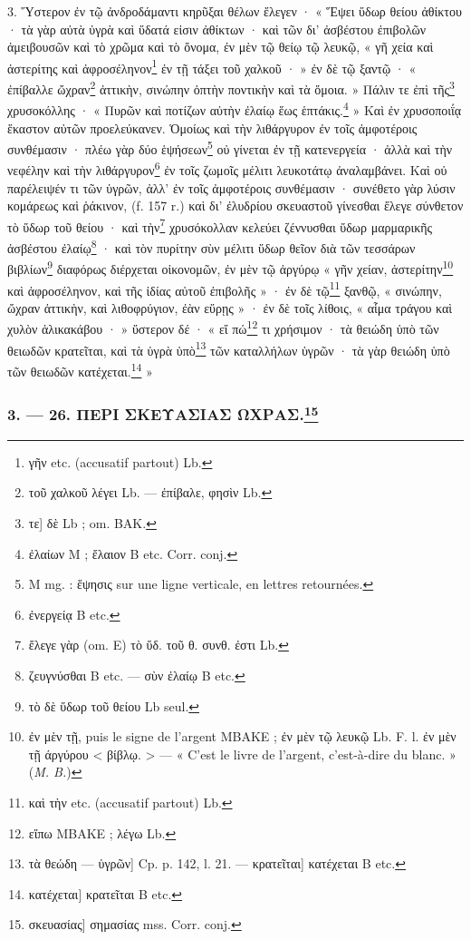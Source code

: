 \documentclass[landscape, a4paper, 11pt, oneside, polutonikogreek, french]{article}
\begin{document}
3. Ὕστερον ἐν τῷ ἀνδροδάμαντι κηρῦξαι θέλων ἔλεγεν · « Ἕψει ὕδωρ θείου ἀθίκτου · τὰ γὰρ αὐτὰ ὑγρὰ καὶ ὕδατά εἰσιν ἀθίκτων · καὶ τῶν δι' ἀσβέστου ἐπιβολῶν ἀμειβουσῶν καὶ τὸ χρῶμα καὶ τὸ ὄνομα, ἐν μὲν τῷ θείῳ τῷ λευκῷ, « γῆ χεία καὶ ἀστερίτης καὶ ἀφροσέληνον\footnote{γῆν etc. (accusatif partout) Lb.} ἐν τῇ τάξει τοῦ χαλκοῦ · » ἐν δὲ τῷ ξαντῷ · « ἐπίβαλλε ὤχραν\footnote{τοῦ χαλκοῦ λέγει Lb. --- ἐπίβαλε, φησὶν Lb.} ἀττικὴν, σινώπην ὀπτὴν ποντικὴν καὶ τὰ ὅμοια. » Πάλιν τε ἐπὶ τῆς\footnote{τε] δὲ Lb ; om. BAK.} χρυσοκόλλης · « Πυρῶν καὶ ποτίζων αὐτὴν ἐλαίῳ ἕως ἑπτάκις.\footnote{ἐλαίων M ; ἔλαιον B etc. Corr. conj.} » Καὶ ἐν χρυσοποιΐᾳ ἕκαστον αὐτῶν προελεύκανεν. Ὁμοίως καὶ τὴν λιθάργυρον ἐν τοῖς ἀμφοτέροις συνθέμασιν · πλέω γὰρ δύο ἑψήσεων\footnote{M mg. : ἕψησις sur une ligne verticale, en lettres retournées.} οὐ γίνεται ἐν τῇ κατενεργεία · ἀλλὰ καὶ τὴν νεφέλην καὶ τὴν λιθάργυρον\footnote{ἐνεργείᾳ B etc.} ἐν τοῖς ζωμοῖς μέλιτι λευκοτάτῳ ἀναλαμβάνει. Καὶ οὐ παρέλειψέν τι τῶν ὑγρῶν, ἀλλ' ἐν τοῖς ἀμφοτέροις συνθέμασιν · συνέθετο γὰρ λύσιν κομάρεως καὶ ῥάκινον, (f. 157 r.) καὶ δι' ἐλυδρίου σκευαστοῦ γίνεσθαι ἔλεγε σύνθετον τὸ ὕδωρ τοῦ θείου · καὶ τὴν\footnote{ἔλεγε γὰρ (om. E) τὸ ὕδ. τοῦ θ. συνθ. ἐστι Lb.} χρυσόκολλαν κελεύει ζέννυσθαι ὕδωρ μαρμαρικῆς ἀσβέστου ἐλαίῳ\footnote{ζευγνύσθαι B etc. --- σὺν ἐλαίῳ B etc.} · καὶ τὸν πυρίτην σὺν μέλιτι ὕδωρ θεῖον διὰ τῶν τεσσάρων βιβλίων\footnote{τὸ δὲ ὕδωρ τοῦ θείου Lb seul.} διαφόρως διέρχεται οἰκονομῶν, ἐν μὲν τῷ ἀργύρῳ « γῆν χείαν, ἀστερίτην\footnote{ἐν μὲν τῇ, puis le signe de l'argent MBAΚE ; ἐν μὲν τῷ λευκῷ Lb. F. l. ἐν μὲν τῇ άργύρου < βίβλῳ. > --- « C'est le livre de l'argent, c'est-à-dire du blanc. » (\emph{M. B.})} καὶ ἀφροσέληνον, καὶ τῆς ἰδίας αὐτοῦ ἐπιβολῆς » · ἐν δὲ τῷ\footnote{καὶ τὴν etc. (accusatif partout) Lb.} ξανθῷ, « σινώπην, ὤχραν ἀττικὴν, καὶ λιθοφρύγιον, ἐὰν εὕρῃς » · ἐν δὲ τοῖς λίθοις, « αἷμα τράγου καὶ χυλὸν ἁλικακάβου · » ὕστερον δέ · « εἴ πώ\footnote{εἴπω MBAKE ; λέγω Lb.} τι χρήσιμον · τὰ θειώδη ὑπὸ τῶν θειωδῶν κρατεῖται, καὶ τὰ ὑγρὰ ὑπὸ\footnote{τὰ θεώδη --- ὑγρῶν] Cp. p. 142, l. 21. --- κρατεῖται] κατέχεται B etc.} τῶν καταλλήλων ὑγρῶν · τὰ γὰρ θειώδη ὑπὸ τῶν θειωδῶν κατέχεται.\footnote{κατέχεται] κρατεῖται B etc.} »

\bigskip
\centerline{\EightStarTaper}
\centerline{\EightStarTaper\EightStarTaper}
\bigskip

\subsubsection[3. --- 26. ΠΕΡΙ ΣΚΕΥΑΣΙΑΣ ΩΧΡΑΣ.]{3. --- 26. ΠΕΡΙ ΣΚΕΥΑΣΙΑΣ ΩΧΡΑΣ.\footnote{σκευασίας] σημασίας mss. Corr. conj.}}
\end{document}
